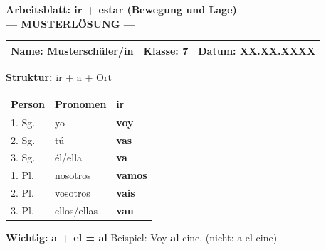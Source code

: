 \documentclass[11pt, a4paper]{article}
\newcommand{\fachfarbe}{spanisch}
\newcommand{\thema}{ir + estar (Bewegung und Lage)}
\newcommand{\klasse}{7}
\newcommand{\loesung}[1]{\textcolor{loesung}{\textbf{#1}}}
\newcommand{\es}[1]{\textcolor{\fachfarbe}{\textbf{#1}}}
\begin{document}
\begin{center}
    {\Large\bfseries\textcolor{\fachfarbe}{Arbeitsblatt: \thema}}\\[0.3em]
    {\large\textcolor{loesung}{\textbf{--- MUSTERLÖSUNG ---}}}
\end{center}

\vspace{5pt}

\noindent
\begin{tabularx}{\textwidth}{|X|X|X|}
\hline
\textbf{Name:} \textcolor{loesung}{Musterschüler/in} &
\textbf{Klasse:} \klasse &
\textbf{Datum:} \textcolor{loesung}{XX.XX.XXXX} \\
\hline
\end{tabularx}

\vspace{15pt}


\begin{merkkasten}

\textbf{Struktur:} ir + a + Ort

\begin{center}
\begin{tabular}{|l|l|l|}
\hline
\textbf{Person} & \textbf{Pronomen} & \textbf{ir} \\
\hline
1. Sg. & yo & \loesung{voy} \\
\hline
2. Sg. & tú & \loesung{vas} \\
\hline
3. Sg. & él/ella & \loesung{va} \\
\hline
1. Pl. & nosotros & \loesung{vamos} \\
\hline
2. Pl. & vosotros & \loesung{vais} \\
\hline
3. Pl. & ellos/ellas & \loesung{van} \\
\hline
\end{tabular}
\end{center}

\vspace{0.5em}
\textbf{Wichtig:} \es{a + el = al} \hspace{1cm} Beispiel: Voy \textbf{al} cine. (nicht: a el cine)
\end{merkkasten}

\vspace{10pt}
\end{document}

